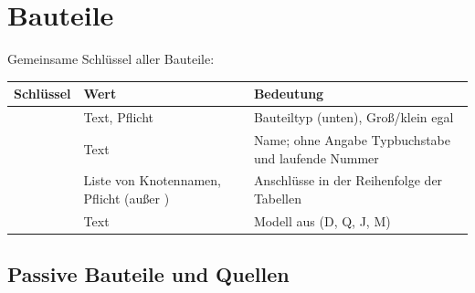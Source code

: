\section{Bauteile}
\label{sec:ref-bauteile}

Gemeinsame Schlüssel aller Bauteile:

\begin{longtable}{@{}P{3.0cm}P{4.3cm}P{6.5cm}@{}}
  \toprule
  Schlüssel & Wert & Bedeutung \\
  \midrule
  \endhead
  \bottomrule
  \endfoot
   & Text, Pflicht & Bauteiltyp (unten), Groß/klein egal \\
   & Text & Name; ohne Angabe Typbuchstabe und laufende Nummer \\
   & Liste von Knotennamen, Pflicht (außer ) & Anschlüsse in der Reihenfolge der Tabellen \\
   & Text & Modell aus  (D, Q, J, M) \\
\end{longtable}

\subsection*{Passive Bauteile und Quellen}


